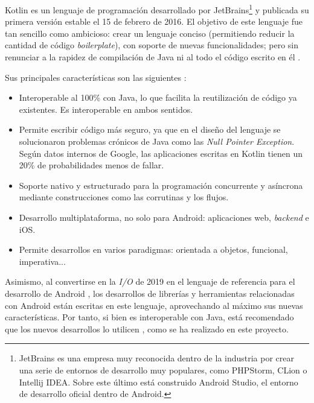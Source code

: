             Kotlin es un lenguaje de programación desarrollado por JetBrains\footnote{JetBrains es una
            empresa muy reconocida dentro de la industria por crear una serie de entornos de desarrollo muy populares,
            como PHPStorm, CLion o Intellij IDEA. Sobre este último está construido Android Studio, el entorno de 
            desarrollo oficial dentro de Android.} y publicada su primera versión estable el 15 de febrero de 2016.
            El objetivo de este lenguaje fue tan sencillo como ambicioso: crear un lenguaje conciso (permitiendo reducir
            la cantidad de código \textit{boilerplate}), con soporte de nuevas funcionalidades; pero sin renunciar a la rapidez de
            compilación de Java ni al todo el código escrito en él 
            \cite{rao_k_history_nodate}. 

            Sus principales características son las siguientes \cite{noauthor_kotlin_nodate} \cite{noauthor_enfoque_nodate}:
            \begin{itemize}
                \item Interoperable al 100\% con Java, lo que facilita la reutilización de código ya existentes. 
                Es interoperable en ambos sentidos.
                \item Permite escribir código más seguro, ya que en el diseño del lenguaje se solucionaron problemas
                crónicos de Java como las \textit{Null Pointer Exception}. Según datos internos de Google, las 
                aplicaciones escritas en Kotlin tienen un 20\% de probabilidades menos de fallar.
                \item Soporte nativo y estructurado para la programación concurrente y asíncrona mediante 
                construcciones como las corrutinas y los flujos.
                \item Desarrollo multiplataforma, no solo para Android: aplicaciones web, \textit{backend} e iOS.
                \item Permite desarrollos en varios paradigmas: orientada a objetos, funcional, imperativa...
            \end{itemize}
            
            Asimismo, al convertirse en la \textit{I/O} de 2019 en el lenguaje de referencia para el desarrollo 
            de Android \cite{braun_celebrating_2022}, los desarrollos de librerías y herramientas relacionadas con 
            Android están escritas en este lenguaje, aprovechando al máximo sus nuevas características. Por tanto, si
            bien es interoperable con Java, está recomendado que los nuevos desarrollos lo utilicen 
            \cite{lardinois_kotlin_2019}, como se ha realizado en este proyecto.
            
